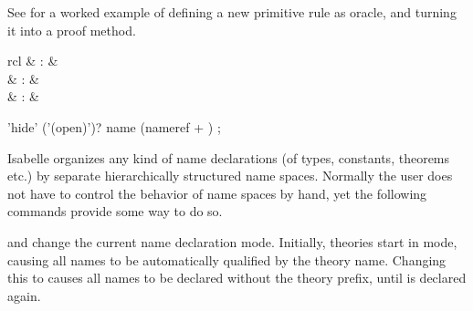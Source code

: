 \begin{isabellebody}
\begin{isamarkuptext}
\begin{description}
  \end{description}

  See \hyperlink{file.~~/src/FOL/ex/Iff-Oracle.thy}{\mbox{}} for a worked example of
  defining a new primitive rule as oracle, and turning it into a proof
  method.%
\end{isamarkuptext}%
\isamarkuptrue%
%
\isamarkuptrue%
%
\begin{isamarkuptext}%
\begin{matharray}{rcl}
    \hypertarget{command.global}{\hyperlink{command.global}{\mbox{}}} & : &  \\
    \hypertarget{command.local}{\hyperlink{command.local}{\mbox{}}} & : &  \\
    \hypertarget{command.hide}{\hyperlink{command.hide}{\mbox{}}} & : &  \\
  \end{matharray}

  \begin{rail}
    'hide' ('(open)')? name (nameref + )
    ;
  \end{rail}

  Isabelle organizes any kind of name declarations (of types,
  constants, theorems etc.) by separate hierarchically structured name
  spaces.  Normally the user does not have to control the behavior of
  name spaces by hand, yet the following commands provide some way to
  do so.

  \begin{description}

  \item \hyperlink{command.global}{\mbox{}} and \hyperlink{command.local}{\mbox{}} change the current
  name declaration mode.  Initially, theories start in \hyperlink{command.local}{\mbox{}} mode, causing all names to be automatically qualified by
  the theory name.  Changing this to \hyperlink{command.global}{\mbox{}} causes all
  names to be declared without the theory prefix, until \hyperlink{command.local}{\mbox{}} is declared again.
  

\end{description}
\end{isamarkuptext}
\end{isabellebody}
